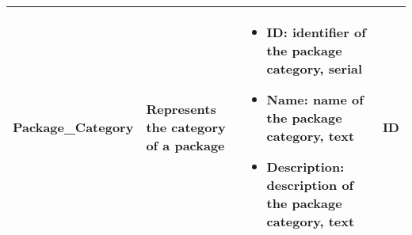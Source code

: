 \begin{longtable}{|p{}|p{} |p{}|p{} |}
    Package\_Category & Represents the category of a package &
        \begin{itemize}
            \vspace{-1em}
            \item ID:   identifier of the package category, serial
            \item Name:   name of the package category, text
            \item Description:   description of the package category, text
        \end{itemize}
    &  ID \\\hline

\end{longtable}